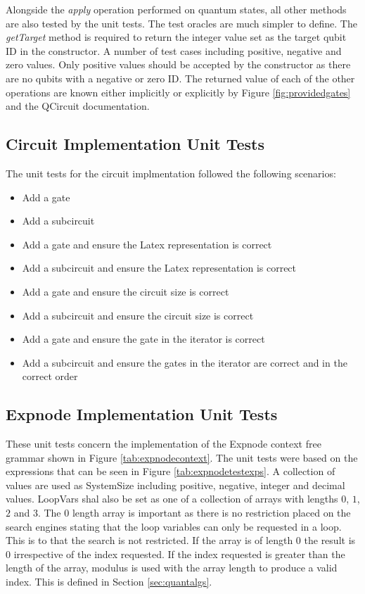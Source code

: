 Alongside the \emph{apply} operation performed on quantum states, all other methods are also tested by the unit tests.
The test oracles are much simpler to define.
The \emph{getTarget} method is required to return the integer value set as the target qubit ID in the constructor.
A number of test cases including positive, negative and zero values.
Only positive values should be accepted by the constructor as there are no qubits with a negative or zero ID.
The returned value of each of the other operations are known either implicitly or explicitly by Figure \ref{fig:providedgates} and the QCircuit\cite{QCsite} documentation.

\subsection{Circuit Implementation Unit Tests}
The unit tests for the circuit implmentation followed the following scenarios:
\begin{itemize}
 \item Add a gate
 \item Add a subcircuit
 \item Add a gate and ensure the Latex representation is correct
 \item Add a subcircuit and ensure the Latex representation is correct
 \item Add a gate and ensure the circuit size is correct
 \item Add a subcircuit and ensure the circuit size is correct
 \item Add a gate and ensure the gate in the iterator is correct
 \item Add a subcircuit and ensure the gates in the iterator are correct and in the correct order
\end{itemize}

\subsection{Expnode Implementation Unit Tests}
These unit tests concern the implementation of the Expnode context free grammar shown in Figure \ref{tab:expnodecontext}.
The unit tests were based on the expressions that can be seen in Figure \ref{tab:expnodetestexps}.
A collection of values are used as SystemSize including positive, negative, integer and decimal values.
LoopVars shal also be set as one of a collection of arrays with lengths $0$, $1$, $2$ and $3$.
The $0$ length array is important as there is no restriction placed on the search engines stating that the loop variables can only be requested in a loop.
This is to that the search is not restricted.
If the array is of length $0$ the result is $0$ irrespective of the index requested.
If the index requested is greater than the length of the array, modulus is used with the array length to produce a valid index.
This is defined in Section \ref{sec:quantalgs}.

